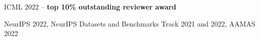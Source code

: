 \documentclass[]{lukas-cv-openfont}
\begin{document}


\noindent
\begin{tightitemize}{1.0em}
    \item ICML 2022 -- \textbf{top 10\% outstanding reviewer award}
    \item NeurIPS 2022, NeurIPS Datasets and Benchmarks Track 2021 and 2022, AAMAS 2022
\end{tightitemize}
\sectionsep



\end{document}
